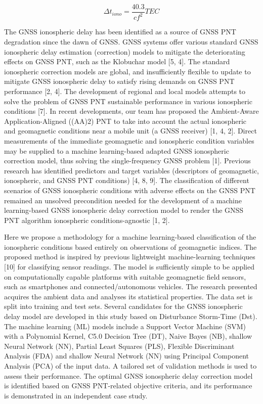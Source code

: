 \documentclass[sn-mathphys-num]{sn-jnl}%
\begin{document}
\begin{equation}
	\Delta t_{iono} = \frac{40.3}{c f^{2}} TEC
	\label{eqn:3}
\end{equation}

The GNSS ionospheric delay has been identified as a source of GNSS PNT degradation since the dawn of GNSS. GNSS systems offer various standard GNSS ionospheric delay estimation (correction) models to mitigate the deteriorating effects on GNSS PNT, such as the Klobuchar model [5, 4]. The standard ionospheric correction models are global, and insufficiently flexible to update to mitigate GNSS ionospheric delay to satisfy rising demands on GNSS PNT performance [2, 4]. The development of regional and local models attempts to solve the problem of GNSS PNT sustainable performance in various ionospheric conditions [7]. In recent developments, our team has proposed the Ambient-Aware Application-Aligned ((AA)2) PNT to take into account the actual ionospheric and geomagnetic conditions near a mobile unit (a GNSS receiver) [1, 4, 2]. Direct measurements of the immediate geomagnetic and ionospheric condition variables may be supplied to a machine learning-based adapted GNSS ionospheric correction model, thus solving the single-frequency GNSS problem [1]. Previous research has identified predictors and target variables (descriptors of geomagnetic, ionospheric, and GNSS PNT conditions) [4, 8, 9]. The classification of different scenarios of GNSS ionospheric conditions with adverse effects on the GNSS PNT remained an unsolved precondition needed for the development of a machine learning-based GNSS ionospheric delay correction model to render the GNSS PNT algorithm ionospheric conditions-agnostic [1, 2].

Here we propose a methodology for a machine learning-based classification of the ionospheric conditions based entirely on observations of geomagnetic indices. The proposed method is inspired by previous lightweight machine-learning techniques [10] for classifying sensor readings. The model is sufficiently simple to be applied on computationally capable platforms with suitable geomagnetic field sensors, such as smartphones and connected/autonomous vehicles. The research presented acquires the ambient data and analyses its statistical properties. The data set is split into training and test sets. Several candidates for the GNSS ionospheric delay model are developed in this study based on Disturbance Storm-Time (Dst). The machine learning (ML) models include a Support Vector Machine (SVM) with a Polynomial Kernel, C5.0 Decision Tree (DT), Naive Bayes (NB), shallow Neural Network (NN), Partial Least Squares (PLS), Flexible Discriminant Analysis (FDA) and shallow Neural Network (NN) using Principal Component Analysis (PCA) of the input data. A tailored set of validation methods is used to assess their performance. The optimal GNSS ionospheric delay correction model is identified based on GNSS PNT-related objective criteria, and its performance is demonstrated in an independent case study.
\end{document}
